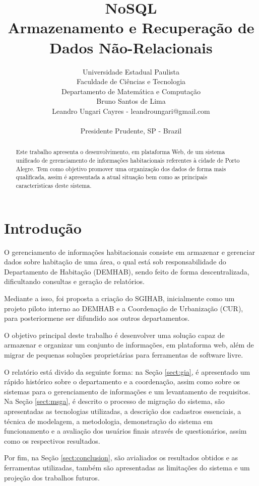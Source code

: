 \documentclass[10pt, twocolumn]{article}
\title{NoSQL\\Armazenamento e Recuperação de Dados Não-Relacionais}
\author{
Universidade Estadual Paulista\\
Faculdade de Ciências e Tecnologia \\ Departamento de Matemática e Computação\\
Bruno Santos de Lima\\
Leandro Ungari Cayres - leandroungari@gmail.com\\
\\
Presidente Prudente, SP - Brazil \\
}
\begin{document}
\maketitle
\begin{abstract}
Este trabalho apresenta o desenvolvimento, em plataforma Web, de um sistema unificado de gerenciamento de informações habitacionais referentes à cidade de Porto Alegre. Tem como objetivo promover uma organização dos dados de forma mais qualificada, assim é apresentada a atual situação bem como as principais caracteristicas deste sistema.
\end{abstract}


\section{Introdução}
\label{sect:introduction}
O gerenciamento de informações habitacionais consiste em armazenar e gerenciar dados sobre habitação de uma área, o qual está sob responsabilidade do Departamento de Habitação (DEMHAB), sendo feito de forma descentralizada, dificultando consultas e geração de relatórios.
 
Mediante a isso, foi proposta a criação do SGIHAB, inicialmente como um projeto piloto interno ao DEMHAB e a Coordenação de Urbanização (CUR), para posteriormene ser difundido aos outros departamentos.

O objetivo principal deste trabalho é desenvolver uma solução capaz de armazenar e organizar um conjunto de informações, em plataforma web, além de migrar de pequenas soluções proprietárias para ferramentas de software livre.

O  relatório está divido da seguinte forma: na Seção \ref{sect:gia}, é apresentado um rápido histórico sobre o departamento e a coordenação, assim como sobre os sistemas para o gerenciamento de informações e um levantamento de requisitos. Na Seção \ref{sect:msga}, é descrito o processo de migração do sistema, são apresentadas as tecnologias utilizadas, a descrição dos cadastros essenciais, a técnica de modelagem, a metodologia, demonstração do sistema em funcionamento e a avaliação dos usuários finais através de questionários, assim como os respectivos resultados.

Por fim, na Seção \ref{sect:conclusion}, são avialiados os resultados obtidos e as ferramentas utilizadas, também são apresentadas as limitações do sistema e um projeção dos trabalhos futuros.
\end{document}
